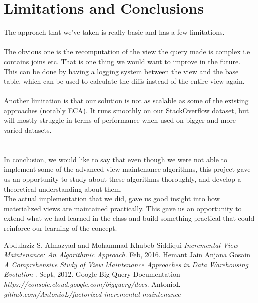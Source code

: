 \documentclass[12pt]{report}
\begin{document}
\section{Limitations and Conclusions}
The approach that we've taken is really basic and has a few limitations.
\\\\The obvious one is the recomputation of the view the query made is complex i.e contains joins etc. That is one thing we would want to improve in the future. This can be done by having a logging system between the view and the base table, which can be used to calculate the diffs instead of the entire view again.
\\\\ Another limitation is that our solution is not as scalable as some of the existing approaches (notably ECA). It runs smoothly on our StackOverflow dataset, but will mostly struggle in terms of performance when used on bigger and more varied datasets.
\\\\\\In conclusion, we would like to say that even though we were not able to implement some of the advanced view maintenance algorithms, this project gave us an opportunity to study about these algorithms thoroughly, and develop a theoretical understanding about them.
\\The actual implementation that we did, gave us good insight into how materialized views are maintained practically. This gave us an opportunity to extend what we had learned in the class and build something practical that could reinforce our learning of the concept.
\begin{thebibliography}{999}
Abdulaziz S. Almazyad and Mohammad Khubeb Siddiqui\emph{ Incremental View Maintenance: An Algorithmic 
Approach}.
 	 Feb, 2016.
Hemant Jain Anjana Gosain \emph{A Comprehensive Study of View Maintenance Approaches in Data Warehousing Evolution }.
 	 Sept, 2012. 	 
Google Big Query Documentation \emph{https://console.cloud.google.com/bigquery/docs}.
AntonioL \emph{github.com/AntonioL/factorized-incremental-maintenance}
\end{thebibliography}
\end{document}
